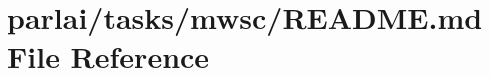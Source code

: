 \hypertarget{parlai_2tasks_2mwsc_2README_8md}{}\section{parlai/tasks/mwsc/\+R\+E\+A\+D\+ME.md File Reference}
\label{parlai_2tasks_2mwsc_2README_8md}

